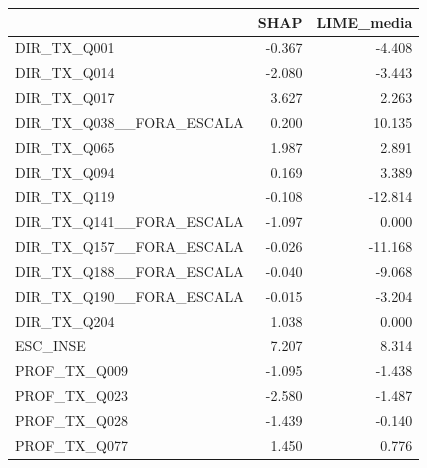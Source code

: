 \begin{tabular}{lrr}
\toprule
 & SHAP & LIME\_media \\
\midrule
DIR\_TX\_Q001 & -0.367 & -4.408 \\
DIR\_TX\_Q014 & -2.080 & -3.443 \\
DIR\_TX\_Q017 & 3.627 & 2.263 \\
DIR\_TX\_Q038\_\_FORA\_ESCALA & 0.200 & 10.135 \\
DIR\_TX\_Q065 & 1.987 & 2.891 \\
DIR\_TX\_Q094 & 0.169 & 3.389 \\
DIR\_TX\_Q119 & -0.108 & -12.814 \\
DIR\_TX\_Q141\_\_FORA\_ESCALA & -1.097 & 0.000 \\
DIR\_TX\_Q157\_\_FORA\_ESCALA & -0.026 & -11.168 \\
DIR\_TX\_Q188\_\_FORA\_ESCALA & -0.040 & -9.068 \\
DIR\_TX\_Q190\_\_FORA\_ESCALA & -0.015 & -3.204 \\
DIR\_TX\_Q204 & 1.038 & 0.000 \\
ESC\_INSE & 7.207 & 8.314 \\
PROF\_TX\_Q009 & -1.095 & -1.438 \\
PROF\_TX\_Q023 & -2.580 & -1.487 \\
PROF\_TX\_Q028 & -1.439 & -0.140 \\
PROF\_TX\_Q077 & 1.450 & 0.776 \\
\bottomrule
\end{tabular}
